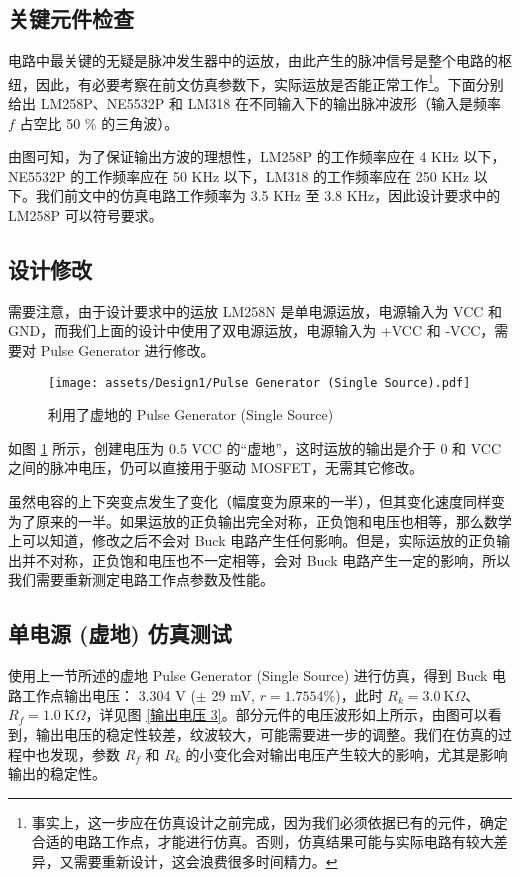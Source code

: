 \documentclass[UTF8]{article}
\def\kO{\ \mathrm{K}\Omega}
\def\kO{\ \mathrm{K}\Omega}
\theoremstyle{MyLineTheoremStyle} %
\theoremstyle{MyBlockTheoremStyle} %
\theoremstyle{MySubsubsectionStyle} %
\begin{document}
\subsection{关键元件检查}
电路中最关键的无疑是脉冲发生器中的运放，由此产生的脉冲信号是整个电路的枢纽，因此，有必要考察在前文仿真参数下，实际运放是否能正常工作\footnote{事实上，这一步应在仿真设计之前完成，因为我们必须依据已有的元件，确定合适的电路工作点，才能进行仿真。否则，仿真结果可能与实际电路有较大差异，又需要重新设计，这会浪费很多时间精力。}。下面分别给出 LM258P、NE5532P 和 LM318 在不同输入下的输出脉冲波形（输入是频率 $f$ 占空比 50 \% 的三角波）。


由图可知，为了保证输出方波的理想性，LM258P 的工作频率应在 4 KHz 以下，NE5532P 的工作频率应在 50 KHz 以下，LM318 的工作频率应在 250 KHz 以下。我们前文中的仿真电路工作频率为 3.5 KHz 至 3.8 KHz，因此设计要求中的 LM258P 可以符号要求。

\subsection{设计修改}

需要注意，由于设计要求中的运放 LM258N 是单电源运放，电源输入为 VCC 和 GND，而我们上面的设计中使用了双电源运放，电源输入为 +VCC 和 -VCC，需要对 Pulse Generator 进行修改。

\begin{figure}[H]\centering
    \texttt{[image: assets/Design1/Pulse Generator (Single Source).pdf]}
    \caption{利用了虚地的 Pulse Generator (Single Source)}
    \label{Pulse Generator (Single Source)}
\end{figure}

如图 \ref{Pulse Generator (Single Source)} 所示，创建电压为 0.5 VCC 的“虚地”，这时运放的输出是介于 0 和 VCC 之间的脉冲电压，仍可以直接用于驱动 MOSFET，无需其它修改。

虽然电容的上下突变点发生了变化（幅度变为原来的一半），但其变化速度同样变为了原来的一半。如果运放的正负输出完全对称，正负饱和电压也相等，那么数学上可以知道，修改之后不会对 Buck 电路产生任何影响。但是，实际运放的正负输出并不对称，正负饱和电压也不一定相等，会对 Buck 电路产生一定的影响，所以我们需要重新测定电路工作点参数及性能。


\subsection{单电源 (虚地) 仿真测试}

使用上一节所述的虚地 Pulse Generator (Single Source) 进行仿真，得到 Buck 电路工作点输出电压： 3.304 V ($\pm$ 29 mV, $r = 1.7554 \%$)，此时 $R_k = 3.0 \kO$、$R_f = 1.0 \kO$，详见图 \ref{输出电压 3}。部分元件的电压波形如上所示，由图可以看到，输出电压的稳定性较差，纹波较大，可能需要进一步的调整。我们在仿真的过程中也发现，参数 $R_f$ 和 $R_k$ 的小变化会对输出电压产生较大的影响，尤其是影响输出的稳定性。
\end{document}
